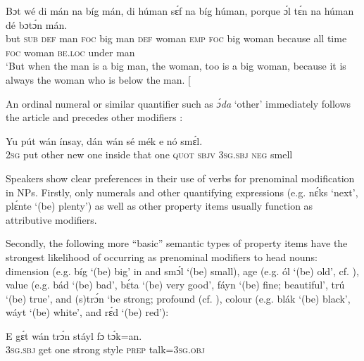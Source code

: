 \ea%
    \label{ex:key:231}
    \gll Bɔt  wé  di  mán  na  bíg  mán,  di  húman  sɛ́f  na  bíg  húman,
porque  ɔ́l  tɛ́n  na  húman  dé    bɔtɔ́n  mán.\\
but  \textsc{sub}  \textsc{def}  man  \textsc{foc}  big  man    \textsc{def}  woman  \textsc{emp}  \textsc{foc}  big  woman
because  all  time  \textsc{foc}  woman  \textsc{be.loc}  under  man\\
\glt ‘But when the man is a big man, the woman, too is a big woman, because 
it is always the woman who is below the man. [\textstylePichiexamplenumberZchnZchn{hi03cb 152]}
\z

An ordinal numeral or similar quantifier such as \textit{ɔ́da} ‘other’ immediately follows the article and precedes other modifiers :


\ea%
    \label{ex:key:232}
    \gll Yu  pút          wán    ínsay,  dán    wán    sé
mék    e    nó  smɛ́l.\\
\textsc{2sg}  put  other  new    one    inside  that    one    \textsc{quot}
\textsc{sbjv}    \textsc{3sg.sbj}  \textsc{neg}  smell\\

\glt 
{} 
\z

Speakers show clear preferences in their use of verbs for prenominal modification in NPs. Firstly, only numerals and other quantifying expressions (e.g. nɛ́ks ‘next’, plɛ́nte ‘(be) plenty’) as well as other property items usually function as attributive modifiers. 


Secondly, the following more “basic” semantic types of property items have the strongest likelihood of occurring as prenominal modifiers to head nouns: dimension (e.g. bíg ‘(be) big’ in  and smɔ́l ‘(be) small), age (e.g. ól ‘(be) old’, cf. ), value (e.g. bád ‘(be) bad’, bɛ́ta ‘(be) very good’, fáyn ‘(be) fine; beautiful’, trú ‘(be) true’, and (s)trɔ́n ‘be strong; profound (cf. ), colour (e.g. blák ‘(be) black’, wáyt ‘(be) white’, and rɛ́d ‘(be) red’):



\ea%
    \label{ex:key:233}
    \gll E    gɛ́t  wán  trɔ́n    stáyl  fɔ  tɔ́k=an.\\
\textsc{3sg.sbj}  get  one  strong  style  \textsc{prep}  talk=\textsc{3sg.obj}\\

